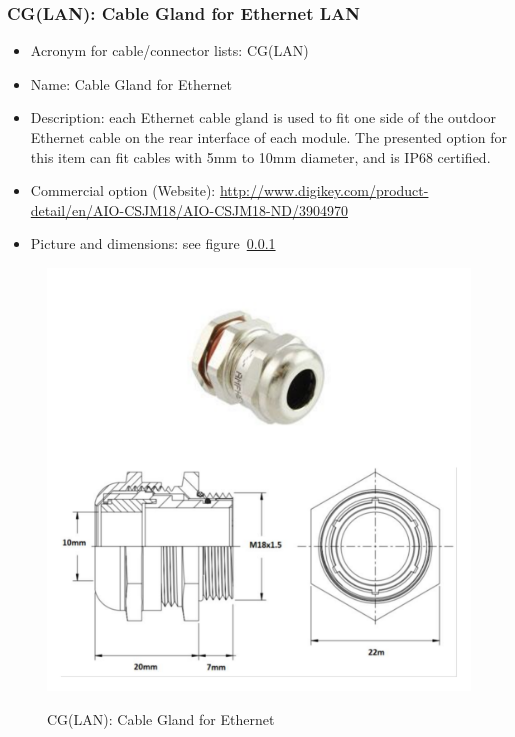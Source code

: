 \subsubsection{CG(LAN): Cable Gland for Ethernet LAN} \label{DEVICE:CG(LAN)}
\begin{itemize}
  \item Acronym for cable/connector lists: CG(LAN)
  \item Name: Cable Gland for Ethernet
  \item Description: each Ethernet cable gland is used to fit one side of the outdoor Ethernet cable on the rear interface of each module. The presented option for this item can fit cables with 5mm to 10mm diameter, and is IP68 certified.
  \item Commercial option (Website): \href{http://www.digikey.com/product-detail/en/AIO-CSJM18/AIO-CSJM18-ND/3904970}{http://www.digikey.com/product-detail/en/AIO-CSJM18/AIO-CSJM18-ND/3904970}
  \item Picture and dimensions: see figure~\ref{DEVICE:CG(LAN)}
\end{itemize}
\begin{figure}
  \centering
  \includegraphics[angle=90,width=1\columnwidth]{figs/body02/FIGDEVICECG(LAN).pdf}\\
  \caption[CG(LAN): Cable Gland for Ethernet]{CG(LAN): Cable Gland for Ethernet}
  \label{FIG:DEVICE:CG(LAN)}
\end{figure}

